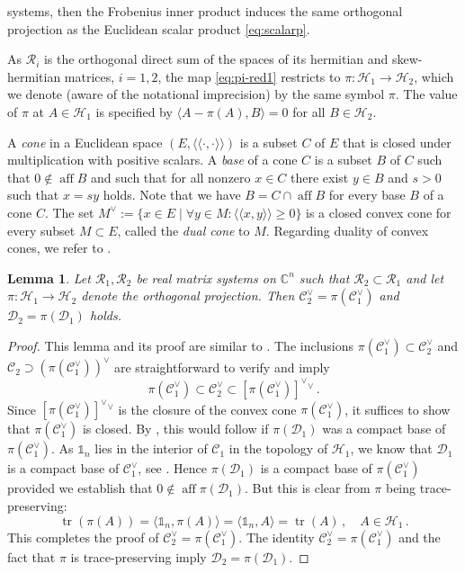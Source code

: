 \documentclass[a4paper,11pt,reqno]{amsart}
\newcommand{\C}{\mathbb{C}}
\newcommand{\cC}{\mathcal{C}}
\newcommand{\cD}{\mathcal{D}}
\newcommand{\cH}{\mathcal{H}}
\newcommand{\cR}{\mathcal{R}}
\newcommand{\id}{\mathds{1}}
\DeclareMathOperator\aff{aff}
\DeclareMathOperator\tr{tr}
\newtheorem{lem}[thm]{Lemma}
\theoremstyle{definition}
\theoremstyle{remark}
\numberwithin{equation}{section}
\begin{document}
systems, then the Frobenius inner product induces the same orthogonal 
projection as the Euclidean scalar product \eqref{eq:scalarp}.
\par
%
As $\cR_i$ is the orthogonal direct sum of the spaces of its hermitian and 
skew-hermitian matrices, $i=1,2$, the map \eqref{eq:pi-red1} restricts to 
$\pi:\cH_1\to\cH_2$, which we denote (aware of the notational imprecision) 
by the same symbol $\pi$. The value of $\pi$ at $A\in\cH_1$ is specified by 
$\langle A-\pi(A),B\rangle=0$ for all $B\in\cH_2$.
\par
%
A \emph{cone} in a  Euclidean space 
$(E,\langle\!\langle\cdot,\cdot\rangle\!\rangle)$ is a subset $C$ of $E$ 
that is closed under multiplication with positive 
scalars. A \emph{base} of a cone $C$ is a subset $B$ of $C$ such that 
$0\not\in\aff B$ and such that for all nonzero $x\in C$ there exist 
$y\in B$ and $s>0$ such that $x=s y$ holds. Note that we have 
$B=C\cap\aff B$ for every base $B$ of a cone $C$. The set 
$M^\vee:=\{x\in E\mid\forall y\in M\colon 
\langle\!\langle x,y\rangle\!\rangle\geq 0\}$ 
is a closed convex cone for every subset $M\subset E$, called the 
\emph{dual cone} to $M$. Regarding duality of convex cones, we refer 
to \cite[Sec.~14]{Rockafellar1970}.
\par
%
\begin{lem}\label{lem:dualcones}
Let $\cR_1,\cR_2$ be real matrix systems on $\C^n$ such that $\cR_2\subset\cR_1$
and let $\pi:\cH_1\to\cH_2$ denote the orthogonal projection.
Then $\cC_2^\vee=\pi(\cC_1^\vee)$ and $\cD_2=\pi(\cD_1)$ holds.
\end{lem}
%
\begin{proof}
This lemma and its proof are similar to \cite[Prop.~5.2]{Plaumann-etal2021}.
The inclusions $\pi(\cC_1^\vee)\subset\cC_2^\vee$ and 
$\cC_2\supset(\pi(\cC_1^\vee))^\vee$ are straightforward to verify and imply
\[
\pi(\cC_1^\vee)
\subset
\cC_2^\vee
\subset 
[\pi(\cC_1^\vee)]^\vee{}^\vee\,.
\]
Since $[\pi(\cC_1^\vee)]^\vee{}^\vee$ is the closure of the convex cone 
$\pi(\cC_1^\vee)$, it suffices to show that $\pi(\cC_1^\vee)$ is closed. 
By \cite[Lemma~3.1]{Plaumann-etal2021}, this would follow if $\pi(\cD_1)$ 
was a compact base of $\pi(\cC_1^\vee)$. As $\id_n$ lies in the interior 
of $\cC_1$ in the topology of $\cH_1$, we know that $\cD_1$ is a compact 
base of $\cC_1^\vee$, see \cite[Lemma~3.3]{Plaumann-etal2021}. Hence 
$\pi(\cD_1)$ is a compact base of $\pi(\cC_1^\vee)$ provided we establish 
that $0\not\in\aff\pi(\cD_1)$. But this is clear from $\pi$ being 
trace-preserving: 
\[
\tr(\pi(A))
=\langle\id_n,\pi(A)\rangle
=\langle\id_n,A\rangle
=\tr(A)\,,
\quad
A\in\cH_1\,.
\]
This completes the proof of $\cC_2^\vee=\pi(\cC_1^\vee)$. The identity 
$\cC_2^\vee=\pi(\cC_1^\vee)$ and the fact that $\pi$ is trace-preserving 
imply $\cD_2=\pi(\cD_1)$. 
\end{proof}
\end{document}

